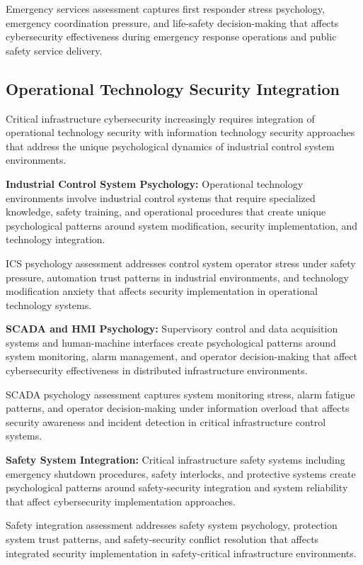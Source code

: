 \documentclass[10pt, twocolumn]{article}
\begin{document}
Emergency services assessment captures first responder stress psychology, emergency coordination pressure, and life-safety decision-making that affects cybersecurity effectiveness during emergency response operations and public safety service delivery.

\subsection{Operational Technology Security Integration}

Critical infrastructure cybersecurity increasingly requires integration of operational technology security with information technology security approaches that address the unique psychological dynamics of industrial control system environments.

\textbf{Industrial Control System Psychology:} Operational technology environments involve industrial control systems that require specialized knowledge, safety training, and operational procedures that create unique psychological patterns around system modification, security implementation, and technology integration.

ICS psychology assessment addresses control system operator stress under safety pressure, automation trust patterns in industrial environments, and technology modification anxiety that affects security implementation in operational technology systems.

\textbf{SCADA and HMI Psychology:} Supervisory control and data acquisition systems and human-machine interfaces create psychological patterns around system monitoring, alarm management, and operator decision-making that affect cybersecurity effectiveness in distributed infrastructure environments.

SCADA psychology assessment captures system monitoring stress, alarm fatigue patterns, and operator decision-making under information overload that affects security awareness and incident detection in critical infrastructure control systems.

\textbf{Safety System Integration:} Critical infrastructure safety systems including emergency shutdown procedures, safety interlocks, and protective systems create psychological patterns around safety-security integration and system reliability that affect cybersecurity implementation approaches.

Safety integration assessment addresses safety system psychology, protection system trust patterns, and safety-security conflict resolution that affects integrated security implementation in safety-critical infrastructure environments.
\end{document}

